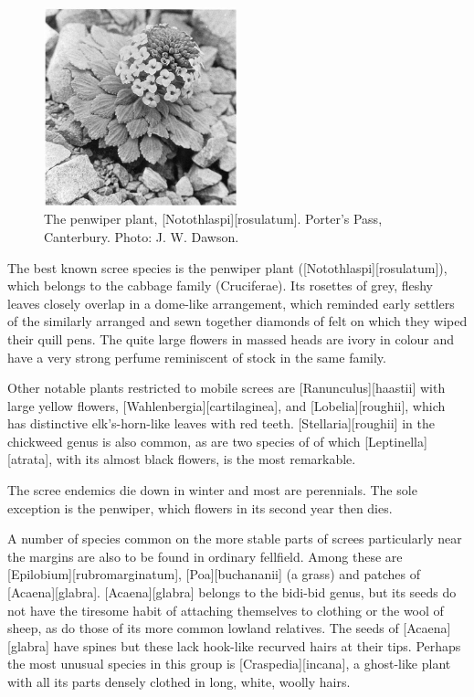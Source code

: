 \begin{figure}
	\includegraphics[width=0.5\textwidth]{graphics/figure112penwiper.jpg}
	\centering
	\caption[The penwiper plant]{The penwiper plant, [Notothlaspi][rosulatum].
Porter's Pass, Canterbury.
	Photo: J. W. Dawson.}%
	\label{fig:112penwiper}
\end{figure}

The best known scree species is the penwiper plant ([Notothlaspi][rosulatum]), which belongs to the cabbage family (Cruciferae).
Its rosettes of grey, fleshy leaves closely overlap in a dome-like arrangement, which reminded early settlers of the similarly arranged and sewn together diamonds of felt on which they wiped their quill pens.
The quite large flowers in massed heads are ivory in colour and have a very strong perfume reminiscent of stock in the same family.

Other notable plants restricted to mobile screes are [Ranunculus][haastii] with large yellow flowers, [Wahlenbergia][cartilaginea], and [Lobelia][roughii], which has distinctive elk's-horn-like leaves with red teeth. [Stellaria][roughii] in the chickweed genus is also common, as are two species of  of which [Leptinella][atrata], with its almost black flowers, is the most remarkable.

The scree endemics die down in winter and most are perennials.
The sole exception is the penwiper, which flowers in its second year then dies.

A number of species common on the more stable parts of screes particularly near the margins are also to be found in ordinary fellfield.
Among these are [Epilobium][rubromarginatum], [Poa][buchananii] (a grass) and patches of [Acaena][glabra]. [Acaena][glabra] belongs to the bidi-bid genus, but its seeds do not have the tiresome habit of attaching themselves to clothing or the wool of sheep, as do those of its more common lowland relatives.
The seeds of [Acaena][glabra] have spines but these lack hook-like recurved hairs at their tips.
Perhaps the most unusual species in this group is [Craspedia][incana], a ghost-like plant with all its parts densely clothed in long, white, woolly hairs.

